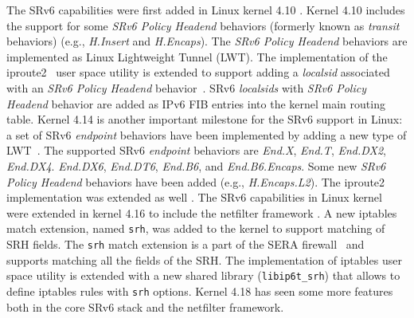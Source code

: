 The SRv6 capabilities were first added in Linux kernel 4.10 \cite{lebrun2017implementing}. Kernel 4.10 includes the support for some \textit{SRv6 Policy Headend} behaviors (formerly known as \textit{transit} behaviors) (e.g., \textit{H.Insert} and \textit{H.Encaps}). The \textit{SRv6 Policy Headend} behaviors are implemented as Linux Lightweight Tunnel (LWT). The implementation of the iproute2~\cite{iproute2} user space utility is extended to support adding a \textit{localsid} associated with an \textit{SRv6 Policy Headend} behavior~\cite{srv6-impl-basic}. SRv6 \textit{localsids} with \textit{SRv6 Policy Headend} behavior are added as IPv6 FIB entries into the kernel main routing table. Kernel 4.14 is another important milestone for the SRv6 support in Linux: a set of SRv6 \textit{endpoint} behaviors have been implemented by adding a new type of LWT~\cite{lebrun2017reaping}. The supported SRv6 \textit{endpoint} behaviors are \textit{End.X}, \textit{End.T}, \textit{End.DX2}, \textit{End.DX4}. \textit{End.DX6}, \textit{End.DT6}, \textit{End.B6}, and \textit{End.B6.Encaps}. Some new \textit{SRv6 Policy Headend} behaviors have been added (e.g., \textit{H.Encaps.L2}). The iproute2 implementation was extended as well \cite{iproute2} \cite{srv6-impl-adv}. The SRv6 capabilities in Linux kernel were extended in kernel 4.16 \cite{kernel4-16} to include the netfilter framework \cite{netfilter}. A new iptables match extension, named \texttt{srh}, was added to the kernel to support matching of SRH fields. The \texttt{srh} match extension is a part of the SERA firewall~\cite{abdelsalam2018sera} and supports matching all the fields of the SRH. The implementation of iptables user space utility \cite{wiki-iptables} is extended with a new shared library (\texttt{libip6t\_srh}) that allows to define iptables rules with \texttt{srh} options. Kernel 4.18 \cite{kernel4-18} has seen some more features both in the core SRv6 stack and the netfilter framework. 

